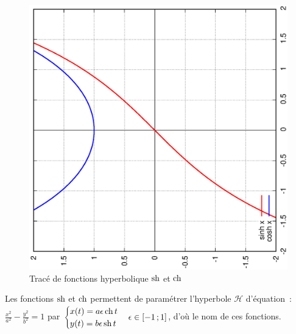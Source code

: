 \begin{figure}
  \centering
  \includegraphics[scale=0.4,angle=-90]{trigh.ps}
  \caption{Tracé de fonctions hyperbolique $\operatorname{sh}$ et $\operatorname{ch}$}
  \label{fig:tracesinhcosh}
\end{figure}
%
Les fonctions $\operatorname{sh}$ et $\operatorname{ch}$ permettent de paramétrer l'hyperbole $\mathcal{H}$ d'équation~: $\frac{x^2}{a^2} - \frac{y^2}{b^2}=1$  par $\begin{cases} x(t)=a \epsilon \operatorname{ch} t \\ y(t)=b \epsilon \operatorname{sh} t\end{cases} \epsilon \in \left[ -1 \, ;  1 \right]$, d'où le nom de ces fonctions.
%
